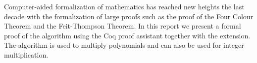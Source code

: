Computer-aided formalization of mathematics has reached new
heights the last decade with the formalization of large proofs
such as the proof of the Four Colour Theorem and the
Feit-Thompson Theorem. In this report we present a formal proof
of the \toom algorithm using the Coq proof assistant together
with the \ssr extension. The \toom algorithm is used to
multiply polynomials and can also be used for integer
multiplication.
